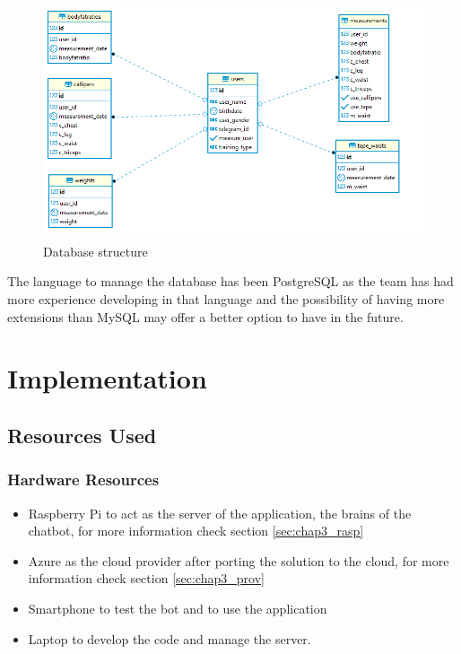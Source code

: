 \begin{center}
	\begin{figure}[h!]
		\centering
		\includegraphics[scale=0.7]{./images/4-database-structure}
		\caption{Database structure}
		\label{4_database_structure}
	\end{figure}
\end{center}

The language to manage the database has been PostgreSQL as the team has had more experience developing in that language and the possibility of having more extensions than MySQL may offer a better option to have in the future.



\section{Implementation}\label{sec:chap4_impl}
\subsection{Resources Used}\label{sec:chap4_res_used}

\subsubsection{Hardware Resources}\label{sec:chap4_hard_res}

\begin{itemize}
	\item{Raspberry Pi to act as the server of the application, the brains of the chatbot, for more information check section \ref{sec:chap3_rasp}}
	\item{Azure as the cloud provider after porting the solution to the cloud, for more information check section \ref{sec:chap3_prov}}
	\item{Smartphone to test the bot and to use the application}
	\item{Laptop to develop the code and manage the server.}
\end{itemize}

